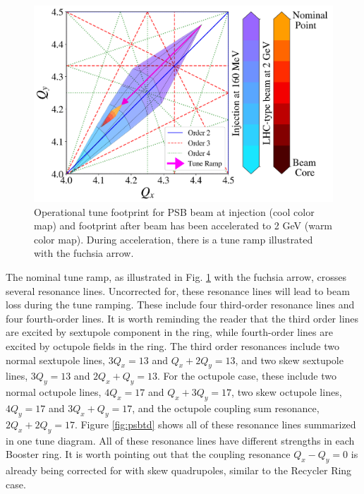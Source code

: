 \begin{figure}[H]
    \centering
    \includegraphics[width=\linewidth,keepaspectratio]{chapter5/operational.png}
    \caption{Operational tune footprint for PSB beam at injection (cool color map) and footprint after beam has been accelerated to 2 GeV (warm color map). During acceleration, there is a tune ramp illustrated with the fuchsia arrow.}
    \label{fig:operational_psb}
\end{figure}

The nominal tune ramp, as illustrated in Fig. \ref{fig:operational_psb} with the fuchsia arrow, crosses several resonance lines. Uncorrected for, these resonance lines will lead to beam loss during the tune ramping. These include four third-order resonance lines and four fourth-order lines. It is worth reminding the reader that the third order lines are excited by sextupole component in the ring, while fourth-order lines are excited by octupole fields in the ring. The third order resonances include two normal sextupole lines, $3Q_x = 13$ and $Q_x+2Q_y = 13$, and two skew sextupole lines, $3Q_y = 13$ and $2Q_x+Q_y = 13$. For the octupole case, these include two normal octupole lines, $4Q_x = 17$ and $Q_x+3Q_y = 17$, two skew octupole lines, $4Q_y = 17$ and $3Q_x+Q_y = 17$, and the octupole coupling sum resonance, $2Q_x +2Q_y =17$. Figure \ref{fig:psbtd} shows all of these resonance lines summarized in one tune diagram. All of these resonance lines have different strengths in each Booster ring. It is worth pointing out that the coupling resonance $Q_x - Q_y = 0$ is already being corrected for with skew quadrupoles, similar to the Recycler Ring case.   


